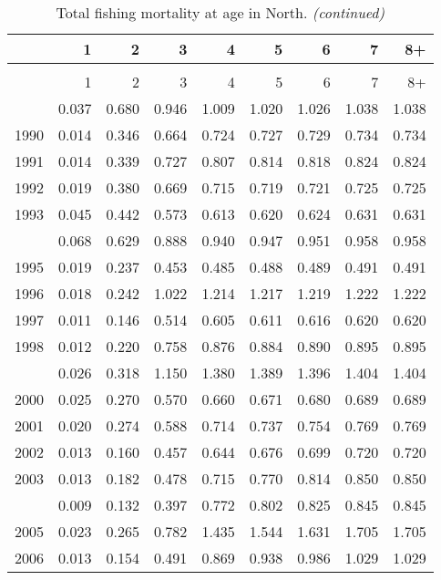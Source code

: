 \documentclass[
]{article}
\begin{document}
\begin{longtable}[t]{lrrrrrrrr}
\caption{\label{tab:North-region-FAA-table}Total fishing mortality at age in North.}\\
\toprule
  & 1 & 2 & 3 & 4 & 5 & 6 & 7 & 8+\\
\midrule
\endfirsthead
\caption[]{Total fishing mortality at age in North. \textit{(continued)}}\\
\toprule
  & 1 & 2 & 3 & 4 & 5 & 6 & 7 & 8+\\
\midrule
\endhead

\endfoot
\bottomrule
\endlastfoot
1989 & 0.037 & 0.680 & 0.946 & 1.009 & 1.020 & 1.026 & 1.038 & 1.038\\
1990 & 0.014 & 0.346 & 0.664 & 0.724 & 0.727 & 0.729 & 0.734 & 0.734\\
1991 & 0.014 & 0.339 & 0.727 & 0.807 & 0.814 & 0.818 & 0.824 & 0.824\\
1992 & 0.019 & 0.380 & 0.669 & 0.715 & 0.719 & 0.721 & 0.725 & 0.725\\
1993 & 0.045 & 0.442 & 0.573 & 0.613 & 0.620 & 0.624 & 0.631 & 0.631\\
\addlinespace
1994 & 0.068 & 0.629 & 0.888 & 0.940 & 0.947 & 0.951 & 0.958 & 0.958\\
1995 & 0.019 & 0.237 & 0.453 & 0.485 & 0.488 & 0.489 & 0.491 & 0.491\\
1996 & 0.018 & 0.242 & 1.022 & 1.214 & 1.217 & 1.219 & 1.222 & 1.222\\
1997 & 0.011 & 0.146 & 0.514 & 0.605 & 0.611 & 0.616 & 0.620 & 0.620\\
1998 & 0.012 & 0.220 & 0.758 & 0.876 & 0.884 & 0.890 & 0.895 & 0.895\\
\addlinespace
1999 & 0.026 & 0.318 & 1.150 & 1.380 & 1.389 & 1.396 & 1.404 & 1.404\\
2000 & 0.025 & 0.270 & 0.570 & 0.660 & 0.671 & 0.680 & 0.689 & 0.689\\
2001 & 0.020 & 0.274 & 0.588 & 0.714 & 0.737 & 0.754 & 0.769 & 0.769\\
2002 & 0.013 & 0.160 & 0.457 & 0.644 & 0.676 & 0.699 & 0.720 & 0.720\\
2003 & 0.013 & 0.182 & 0.478 & 0.715 & 0.770 & 0.814 & 0.850 & 0.850\\
\addlinespace
2004 & 0.009 & 0.132 & 0.397 & 0.772 & 0.802 & 0.825 & 0.845 & 0.845\\
2005 & 0.023 & 0.265 & 0.782 & 1.435 & 1.544 & 1.631 & 1.705 & 1.705\\
2006 & 0.013 & 0.154 & 0.491 & 0.869 & 0.938 & 0.986 & 1.029 & 1.029\\

\end{longtable}
\end{document}
